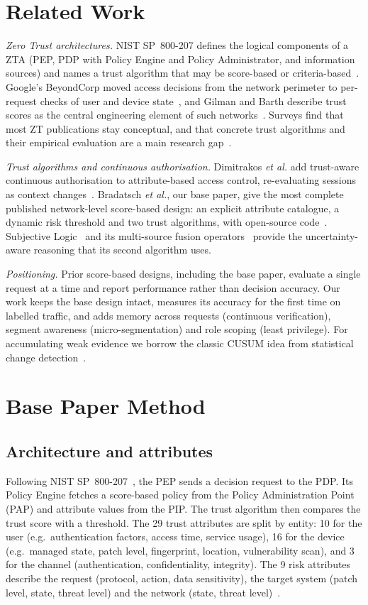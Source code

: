 \documentclass[conference,a4paper]{IEEEtran}
\begin{document}
\section{Related Work}\label{sec:related}
\emph{Zero Trust architectures.} NIST SP~800-207 defines the logical components of a ZTA (PEP, PDP with Policy Engine and Policy Administrator, and information sources) and names a trust algorithm that may be score-based or criteria-based~\cite{nist}. Google's BeyondCorp moved access decisions from the network perimeter to per-request checks of user and device state~\cite{beyondcorp}, and Gilman and Barth describe trust scores as the central engineering element of such networks~\cite{gilman}. Surveys find that most ZT publications stay conceptual, and that concrete trust algorithms and their empirical evaluation are a main research gap~\cite{syed,buck}.

\emph{Trust algorithms and continuous authorisation.} Dimitrakos \emph{et al.} add trust-aware continuous authorisation to attribute-based access control, re-evaluating sessions as context changes~\cite{dimitrakos}. Bradatsch \emph{et al.}, our base paper, give the most complete published network-level score-based design: an explicit attribute catalogue, a dynamic risk threshold and two trust algorithms, with open-source code~\cite{base,repo}. Subjective Logic~\cite{josang} and its multi-source fusion operators~\cite{fusion} provide the uncertainty-aware reasoning that its second algorithm uses.

\emph{Positioning.} Prior score-based designs, including the base paper, evaluate a single request at a time and report performance rather than decision accuracy. Our work keeps the base design intact, measures its accuracy for the first time on labelled traffic, and adds memory across requests (continuous verification), segment awareness (micro-segmentation) and role scoping (least privilege). For accumulating weak evidence we borrow the classic CUSUM idea from statistical change detection~\cite{page}.

\section{Base Paper Method}\label{sec:base}
\subsection{Architecture and attributes}
Following NIST SP~800-207~\cite{nist}, the PEP sends a decision request to the PDP. Its Policy Engine fetches a score-based policy from the Policy Administration Point (PAP) and attribute values from the PIP. The trust algorithm then compares the trust score with a threshold. The 29 trust attributes are split by entity: 10 for the user (e.g.\ authentication factors, access time, service usage), 16 for the device (e.g.\ managed state, patch level, fingerprint, location, vulnerability scan), and 3 for the channel (authentication, confidentiality, integrity). The 9 risk attributes describe the request (protocol, action, data sensitivity), the target system (patch level, state, threat level) and the network (state, threat level)~\cite{base}.
\end{document}
